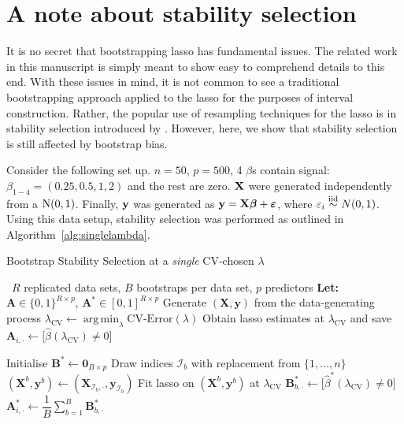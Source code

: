 \clearpage
\section{A note about stability selection}
\label{sec:stability}

It is no secret that bootstrapping lasso has fundamental issues. The related work in this manuscript is simply meant to show easy to comprehend details to this end. With these issues in mind, it is not common to see a traditional bootstrapping approach applied to the lasso for the purposes of interval construction. Rather, the popular use of resampling techniques for the lasso is in stability selection introduced by  \cite{Meinshausen2010}. However, here, we show that stability selection is still affected by bootstrap bias.

Consider the following set up. $n = 50$, $p = 500$, 4 $\beta$s contain signal: $\beta_{1-4} = (0.25, 0.5, 1, 2)$ and the rest are zero. $\mathbf{X}$ were generated independently from a $\textrm{N}(0, 1)$. Finally, $\mathbf{y}$ was generated as $\mathbf{y} = \mathbf{X}\boldsymbol{\beta} + \boldsymbol{\varepsilon}$, where $\varepsilon_i \overset{\text{iid}}{\sim} N(0, 1)$. Using this data setup, stability selection was performed as outlined in Algorithm~\ref{alg:singlelambda}.

\begin{algorithm}[!ht]
\caption{Bootstrap Stability Selection at a \emph{single} CV‐chosen $\lambda$}
\label{alg:singlelambda}
\begin{algorithmic}[1]
\Require\ $R$ replicated data sets, $B$ bootstraps per data set,
          $p$ predictors
\Statex \textbf{Let:}
  $\mathbf A \in\{0,1\}^{R\times p}$, $\mathbf A^{\!*}\in[0,1]^{R\times p}$
%
  \State Generate $(\mathbf X,\mathbf y)$ from the data-generating process
  \State $\lambda_{\text{CV}}\leftarrow
         \operatorname*{arg\,min}_{\lambda}\text{CV‐Error}(\lambda)$
  \State Obtain lasso estimates at $\lambda_{\text{CV}}$
        and save
        $\mathbf A_{i,\cdot}\gets\bigl[\hat\beta(\lambda_{\text{CV}})\neq 0\bigr]$

  \State Initialise $\mathbf B^{\!*}\gets\mathbf 0_{B\times p}$
                          
     \State Draw indices $\mathcal I_b$ with replacement from $\{1,\dots,n\}$
     \State $(\mathbf X^{b},\mathbf y^{b})\gets
            (\mathbf X_{\mathcal I_b,\cdot},\mathbf y_{\mathcal I_b})$
     \State Fit lasso on $(\mathbf X^{b},\mathbf y^{b})$ at $\lambda_{\text{CV}}$
     \State $\mathbf B^{\!*}_{b,\cdot}\gets
            \bigl[\hat\beta^{\!*}(\lambda_{\text{CV}})\neq 0\bigr]$
  \EndFor
  \State $\mathbf A^{\!*}_{i,\cdot}\gets
         \dfrac1B\sum_{b=1}^{B}\mathbf B^{\!*}_{b,\cdot}$
\EndFor
\end{algorithmic}
\end{algorithm}


